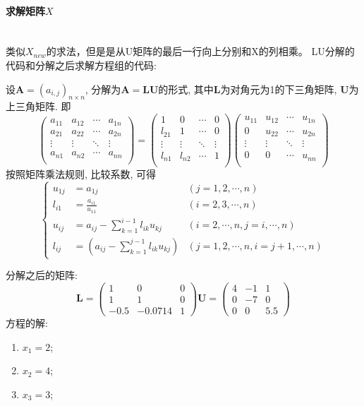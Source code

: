 \paragraph{求解矩阵$X$}
~\\
类似$X_{new}$的求法，但是是从U矩阵的最后一行向上分别和X的列相乘。
LU分解的代码和分解之后求解方程组的代码:

设$\mathbf{A} = \left(a_{i,j}\right)_{n \times n}$, 分解为$\mathbf{A} = \mathbf{LU}$的形式, 其中$\mathbf{L}$为对角元为1的下三角矩阵, $\mathbf{U}$为上三角矩阵. 即
$$
\left(
\begin{matrix}
a_{11} & a_{12} & \cdots & a_{1n} \\
a_{21} & a_{22} & \cdots & a_{2n} \\
\vdots & \vdots & \ddots & \vdots \\
a_{n1} & a_{n2} & \cdots & a_{nn} \\
\end{matrix}
\right) =
\left(
\begin{matrix}
1 & 0 & \cdots & 0 \\
l_{21} & 1 & \cdots & 0 \\
\vdots & \vdots & \ddots & \vdots \\
l_{n1} & l_{n2} & \cdots & 1 \\
\end{matrix}
\right) 
\left(
\begin{matrix}
u_{11} & u_{12} & \cdots & u_{1n} \\
0 & u_{22} & \cdots & u_{2n}\\
\vdots & \vdots & \ddots & \vdots \\
0 & 0 & \cdots & u_{nn} \\
\end{matrix}
\right)
$$
按照矩阵乘法规则, 比较系数, 可得
$$
\left\{
\begin{aligned}
u_{1j} &= a_{1j}  &\left(j=1,2,\cdots,n\right) \\
l_{i1} &= \frac{a_{i1}}{u_{11}} &\left(i=2,3,\cdots,n \right)\\
u_{ij} &= a_{ij} - \sum_{k=1}^{i-1}l_{ik}u_{kj} &\left(i=2,\cdots,n,j=i,\cdots,n\right) \\
l_{ij} &= \left(a_{ij} - \sum_{k=1}^{j-1}l_{ik}u_{kj}\right) &\left(j=1,2,\cdots,n,i=j+1,\cdots,n\right)
\end{aligned}
\right.$$

分解之后的矩阵:
$$
\mathbf{L} = 
\left(
\begin{matrix}
1 & 0 & 0 \\
1 &  1 & 0 \\
-0.5 &  -0.0714 & 1
\end{matrix}
\right)
\mathbf{U} = 
\left(
\begin{matrix}
4 & -1 & 1 \\
0 &  -7 & 0 \\
0 &  0 & 5.5
\end{matrix}
\right)
$$
方程的解:
\begin{enumerate}
	\item $x_1 = 2$;
	\item $x_2 = 4$;
	\item $x_3 = 3$;
\end{enumerate}

